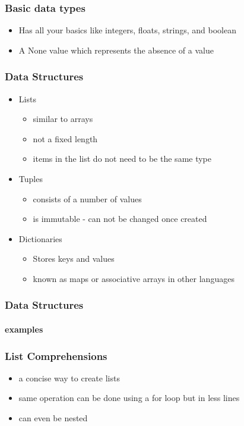 \documentclass{beamer}
\begin{document}
\begin{frame}
  \frametitle{Basic data types}
  \begin{itemize}
    \item Has all your basics like integers, floats, strings, and boolean
    \item A None value which represents the absence of a value
  \end{itemize}
  \centerline{}
\end{frame}
\begin{frame}
  \frametitle{Data Structures}
  \begin{itemize}
    \item Lists
      \begin{itemize}
        \item similar to arrays
        \item not a fixed length
        \item items in the list do not need to be the same type
      \end{itemize}
    \item Tuples
      \begin{itemize}
        \item consists of a number of values
        \item is immutable - can not be changed once created
      \end{itemize}
    \item Dictionaries
      \begin{itemize}
        \item Stores keys and values
        \item known as maps or associative arrays in other languages
      \end{itemize}
  \end{itemize}
\end{frame}
\begin{frame}
  \frametitle{Data Structures}
  \framesubtitle{examples}
  \centerline{}
\end{frame}
\begin{frame}
  \frametitle{List Comprehensions}
  \begin{itemize}
    \item a concise way to create lists 
    \item same operation can be done using a for loop but in less lines
    \item can even be nested
  \end{itemize}
  \centerline{}
\end{frame}
\end{document}
